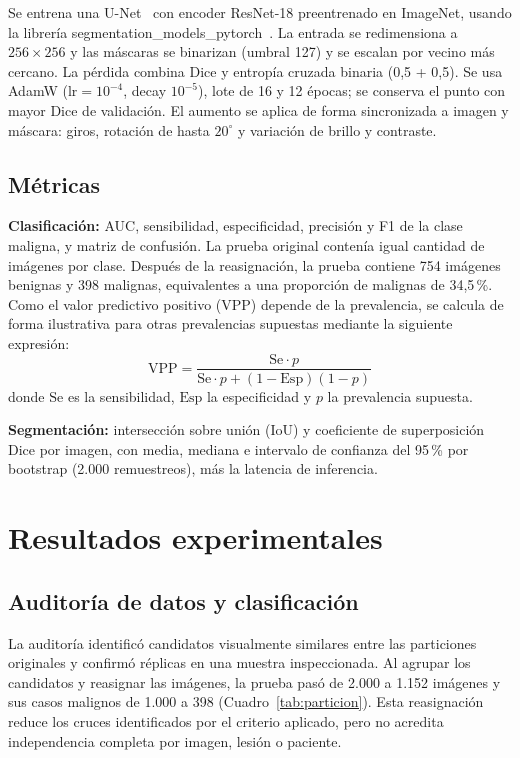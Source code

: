 \documentclass[conference]{IEEEtran}
\begin{document}
	Se entrena una U-Net~\cite{ronneberger2015} con encoder ResNet-18 preentrenado en ImageNet, usando la librería segmentation\_models\_pytorch~\cite{iakubovskii2019}. La entrada se redimensiona a $256\times256$ y las máscaras se binarizan (umbral 127) y se escalan por vecino más cercano. La pérdida combina Dice y entropía cruzada binaria (0,5 + 0,5). Se usa AdamW ($\mathrm{lr} = 10^{-4}$, decay $10^{-5}$), lote de 16 y 12 épocas; se conserva el punto con mayor Dice de validación. El aumento se aplica de forma sincronizada a imagen y máscara: giros, rotación de hasta $20^{\circ}$ y variación de brillo y contraste.
	
	\subsection{Métricas}
	
	\textbf{Clasificación:} AUC, sensibilidad, especificidad, precisión y F1 de la clase maligna, y matriz de confusión. La prueba original contenía igual cantidad de imágenes por clase. Después de la reasignación, la prueba contiene 754 imágenes benignas y 398 malignas, equivalentes a una proporción de malignas de 34,5\,\%. Como el valor predictivo positivo (VPP) depende de la prevalencia, se calcula de forma ilustrativa para otras prevalencias supuestas mediante la siguiente expresión:
	\begin{equation}
		\mathrm{VPP} = \frac{\mathrm{Se}\cdot p}{\mathrm{Se}\cdot p + (1-\mathrm{Esp})(1-p)}
		\label{eq:vpp}
	\end{equation}
	donde $\mathrm{Se}$ es la sensibilidad, $\mathrm{Esp}$ la especificidad y $p$ la prevalencia supuesta.
	
	\textbf{Segmentación:} intersección sobre unión (IoU) y coeficiente de superposición Dice por imagen, con media, mediana e intervalo de confianza del 95\,\% por bootstrap (2.000 remuestreos), más la latencia de inferencia.
	
	\section{Resultados experimentales}
	
	\subsection{Auditoría de datos y clasificación}
	
	La auditoría identificó candidatos visualmente similares entre las particiones originales y confirmó réplicas en una muestra inspeccionada. Al agrupar los candidatos y reasignar las imágenes, la prueba pasó de 2.000 a 1.152 imágenes y sus casos malignos de 1.000 a 398 (Cuadro~\ref{tab:particion}). Esta reasignación reduce los cruces identificados por el criterio aplicado, pero no acredita independencia completa por imagen, lesión o paciente.
	
\end{document}
